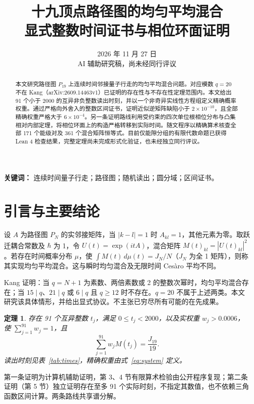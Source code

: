 \documentclass[11pt,a4paper]{article}
\title{十九顶点路径图的均匀平均混合\\\large 显式整数时间证书与相位环面证明}
\author{}
\date{2026 年 11 月 27 日 \\ \small AI 辅助研究稿，尚未经同行评议}
\newtheorem{theorem}{定理}\newtheorem{lemma}{引理}
\begin{document}
\maketitle
\begin{abstract}
本文研究路径图 $P_{19}$ 上连续时间邻接量子行走的均匀平均混合问题。对应模数 $q=20$ 不在 Kang（arXiv:2609.14463v1）已证明的存在性与不存在性定理范围内。本文给出 91 个小于 2000 的互异非负整数读出时刻，并以一个非奇异实线性方程组定义精确概率权重。通过严格向外舍入的整数区间证书，证明近似逆矩阵缺陷小于 $2\times10^{-10}$，且全部精确权重严格大于 $6\times10^{-4}$。另一条证明路线利用受约束的四次单位根相位分布与凸集相对内部定理，将相位环面上的构造严格转移到实际时间。随文程序以精确算术核查全部 171 个能级对及 361 个混合矩阵恒等式。目前仅能隙分组的有限代数命题已获得 Lean 4 检查结果，完整定理尚未完成形式化验证，也未经独立同行评议。
\end{abstract}
\noindent\textbf{关键词：} 连续时间量子行走；路径图；随机读出；圆分域；区间证书。
\section{引言与主要结论}
设 $A$ 为路径图 $P_N$ 的实邻接矩阵，当 $|k-l|=1$ 时 $A_{kl}=1$，其他元素为零。取跃迁耦合常数及 $\hbar$ 为 1，令 $U(t)=\exp(itA)$，混合矩阵 $M(t)_{kl}=|U(t)_{kl}|^2$。若存在时间概率分布 $\mu$，使 $\int M(t)\,d\mu(t)=J_N/N$（$J_N$ 为全 1 矩阵），则称其实现均匀平均混合。这与瞬时均匀混合及无限时间 Cesàro 平均不同\cite{baptista,godsil}。

Kang\cite{kang} 证明：当 $q=N+1$ 为素数、两倍素数或 2 的整数次幂时，均匀平均混合存在；当 $15\mid q$、$21\mid q$ 或 $6\mid q$ 且 $q\ge12$ 时不存在。$q=20$ 不属于上述两类。本文研究该具体情形，并给出显式协议。不主张已穷尽所有可能的在先成果。
\begin{theorem}\label{thm:main}
存在 91 个互异整数 $t_j$，满足 $0\le t_j<2000$，以及实权重 $w_j>0.0006$，使 $\sum_{j=1}^{91}w_j=1$，且
\begin{equation}\label{eq:main}
\sum_{j=1}^{91}w_j M(t_j)=\frac{J_{19}}{19}.
\end{equation}
读出时刻见表~\ref{tab:times}，精确权重由式~\eqref{eq:system} 定义。
\end{theorem}
第一条证明为计算机辅助证明，第 3、4 节有限算术检验由公开程序复现；第二条证明（第 5 节）独立证明存在至多 91 个实际时刻，不指定其数值，也不依赖三角函数区间计算。两条路线共享谱分解。
\end{document}
